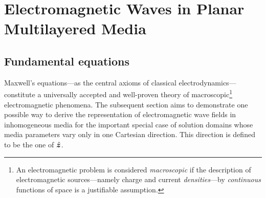 







\chapter{Electromagnetic Waves in Planar Multilayered Media}
\label{ch:em_case}







\section{Fundamental equations}
\label{sec:em_fundamental_equations}

Maxwell's equations---as the central axioms of classical
electrodynamics---constitute a universally accepted and well-proven theory
of macroscopic\footnote{An electromagnetic problem is considered
\emph{macroscopic} if the description of electromagnetic sources---namely
charge and current \emph{densities}---by \emph{continuous} functions of
space is a justifiable assumption.} electromagnetic phenomena.
The subsequent section aims to demonstrate one possible way to derive the
representation of electromagnetic wave fields in inhomogeneous media for the
important special case of solution domains whose media parameters vary only in
one Cartesian direction.
This direction is defined to be the one of $\uv{z}$.

